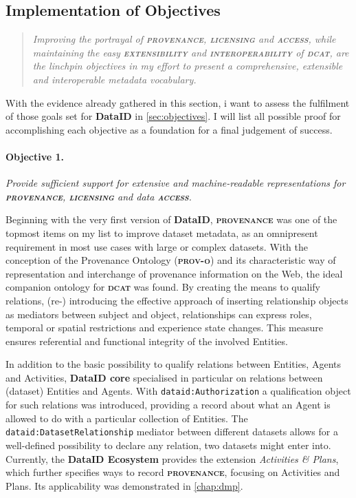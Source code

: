 \documentclass[a4paper,english,twoside,BCOR1.5cm,headsepline,DIV12,appendixprefix,final,12pt]{scrbook}
\newcommand{\provenance}{{\ttfamily\scshape\bfseries provenance}\xspace}
\newcommand{\licensing}{{\ttfamily\scshape\bfseries licensing}\xspace}
\newcommand{\access}{{\ttfamily\scshape\bfseries access}\xspace}
\newcommand{\extensibility}{{\ttfamily\scshape\bfseries extensibility}\xspace}
\newcommand{\interoperability}{{\ttfamily\scshape\bfseries interoperability}\xspace}
\newcommand{\ecosystem}{{\ttfamily\bfseries DataID Ecosystem}\xspace}
\newcommand{\dataid}{{\ttfamily\bfseries DataID}\xspace}
\newcommand{\core}{{\ttfamily\bfseries DataID core}\xspace}
\newcommand{\prov}{{\scshape\bfseries prov-o}\xspace}
\newcommand{\dcat}{{\scshape\bfseries dcat}\xspace}
\newcommand{\prop}[1]{{{\texttt{#1}}}}
\begin{document}
\subsection{Implementation of Objectives}
\label{sec:evalimplementation}
\begin{quote}
\textit{Improving the portrayal of \provenance, \licensing and \access, while maintaining the easy \extensibility and \interoperability of \dcat, are the linchpin objectives in my effort to present a comprehensive, extensible and interoperable metadata vocabulary.}
\end{quote}


With the evidence already gathered in this section, i want to assess the fulfilment of those goals set for \dataid in \cref{sec:objectives}. I will list all possible proof for accomplishing each objective as a foundation for a final judgement of success.

\paragraph{Objective 1.} \textit{Provide sufficient support for extensive and machine-readable representations for \provenance, \licensing and data \access.}

Beginning with the very first version of \dataid, \provenance was one of the topmost items on my list to improve dataset metadata, as an omnipresent requirement in most use cases with large or complex datasets. With the conception of the Provenance Ontology (\prov) and its characteristic way of representation and interchange of provenance information on the Web, the ideal companion ontology for \dcat was found. By creating the means to qualify relations, (re-) introducing the effective approach of inserting relationship objects as mediators between subject and object, relationships can express roles, temporal or spatial restrictions and experience state changes. This measure ensures referential and functional integrity of the involved Entities.

In addition to the basic possibility to qualify relations between Entities, Agents and Activities, \core specialised in particular on relations between (dataset) Entities and Agents. With \prop{dataid:Authorization} a qualification object for such relations was introduced, providing a record about what an Agent is allowed to do with a particular collection of Entities. The \prop{dataid:DatasetRelationship} mediator between different datasets allows for a well-defined possibility to declare any relation, two datasets might enter into. 
Currently, the \ecosystem provides the extension \textit{Activities \& Plans}, which further specifies ways to record \provenance, focusing on Activities and Plans. Its applicability was demonstrated in \cref{chap:dmp}.
\end{document}
